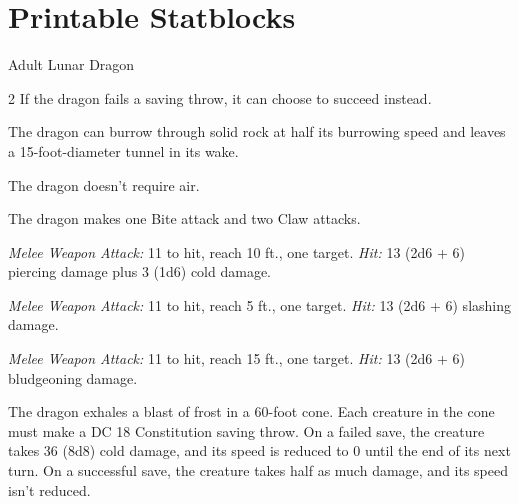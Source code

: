 \documentclass[10pt,a4paper,twoside,bg=print,twocolumn,openany,nodeprecatedcode]{dndbook}
\begin{document}
\chapter*{Printable Statblocks}
\pagestyle{empty}

\begin{DndMonster}[float*=b,width=\textwidth + 8pt]{Adult Lunar Dragon}
\begin{multicols}{2}
\DndMonsterBasics[
armor-class = {17 (natural armor)},
hit-points = {\DndDice{15d12 + 75}},
speed = {40 ft., burrow 20 ft., fly 80 ft.}
]
\DndMonsterAbilityScores[
 str = 23,
 dex = 12,
 con = 20,
 int = 10,
 wis = 13,
 cha = 15
]
\DndMonsterDetails[
saving-throws = {Con +10, Wis +6},
skills = {Perception +11, Stealth +11},
damage-immunities = {cold},
senses = {darkvision 240 ft., passive perception 21},
languages = {Draconic},
challenge = 13,
]
If the dragon fails a saving throw, it can choose to succeed instead.

The dragon can burrow through solid rock at half its burrowing speed and leaves a 15-foot-diameter tunnel in its wake.

The dragon doesn't require air.

The dragon makes one Bite attack and two Claw attacks.

\textsl{Melee Weapon Attack:} 11 to hit, reach 10 ft., one target. \textsl{Hit:} 13 (2d6 + 6) piercing damage plus 3 (1d6) cold damage.

\textsl{Melee Weapon Attack:} 11 to hit, reach 5 ft., one target. \textsl{Hit:} 13 (2d6 + 6) slashing damage.

\textsl{Melee Weapon Attack:} 11 to hit, reach 15 ft., one target. \textsl{Hit:} 13 (2d6 + 6) bludgeoning damage.

The dragon exhales a blast of frost in a 60-foot cone. Each creature in the cone must make a DC 18 Constitution saving throw. On a failed save, the creature takes 36 (8d8) cold damage, and its speed is reduced to 0 until the end of its next turn. On a successful save, the creature takes half as much damage, and its speed isn't reduced.


\end{multicols}
\end{DndMonster}
\end{document}
